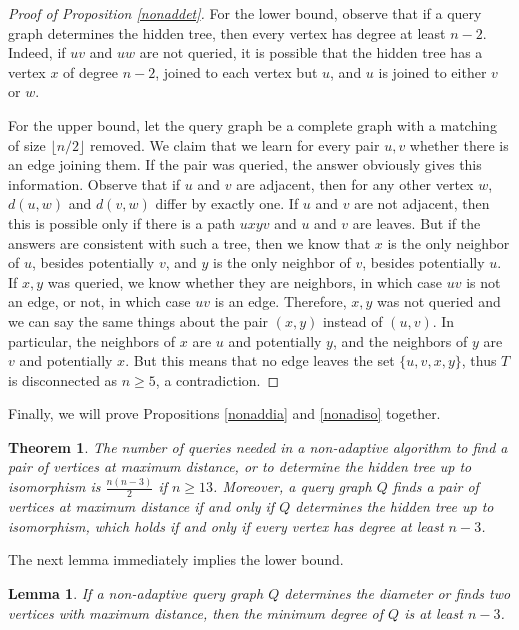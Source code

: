 \documentclass[12pt,a4paper]{amsart}
\theoremstyle{plain}
\newtheorem{thm}{Theorem}[section]
\newtheorem{lemma}[theorem]{Lemma}
\theoremstyle{definition}
\begin{document}
\begin{proof}[Proof of Proposition \ref{nonaddet}]
For the lower bound, observe that if a query graph determines the hidden tree, then every vertex has degree at least $n-2$. Indeed, if $uv$ and $uw$ are not queried, it is possible that the hidden tree has a vertex $x$ of degree $n-2$, joined to each vertex but $u$, and $u$ is joined to either $v$ or $w$. 

For the upper bound, let the query graph be a complete graph with a matching of size $\lfloor n/2\rfloor$ removed. We claim that we learn for every pair $u,v$ whether there is an edge joining them. If the pair was queried, the answer obviously gives this information. 
Observe that if $u$ and $v$ are adjacent, then for any other vertex $w$, $d(u,w)$ and $d(v,w)$ differ by exactly one. 
If $u$ and $v$ are not adjacent, then this is possible only if there is a path $uxyv$ and $u$ and $v$ are leaves. 
But if the answers are consistent with such a tree, then we know that $x$ is the only neighbor of $u$, besides potentially $v$, and $y$ is the only neighbor of $v$, besides potentially $u$. If $x,y$ was queried, we know whether they are neighbors, in which case $uv$ is not an edge, or not, in which case $uv$ is an edge. Therefore, $x,y$ was not queried and we can say the same things about the pair $(x,y)$ instead of $(u,v)$. In particular, the neighbors of $x$ are $u$ and potentially $y$, and the neighbors of $y$ are $v$ and potentially $x$. But this means that no edge leaves the set $\{u,v,x,y\}$, thus $T$ is disconnected as $n\ge 5$, a contradiction.    
\end{proof}

Finally, we will prove Propositions \ref{nonaddia} and \ref{nonadiso} together. 



\begin{thm}\label{nemad}
    The number of queries needed in a non-adaptive algorithm to find a pair of vertices at maximum distance, or to determine the hidden tree up to isomorphism is $\frac{n(n-3)}{2}$ if $n \geq 13$. Moreover, a query graph $Q$ finds a pair of vertices at maximum distance if and only if $Q$ determines the hidden tree up to isomorphism, which holds if and only if every vertex has degree at least $n-3$.
\end{thm}

The next lemma immediately implies the lower bound.

\begin{lemma}\label{lemi}
    If a non-adaptive query graph $Q$ determines the diameter or finds two vertices with maximum distance, then the minimum degree of $Q$ is at least $n-3$.
\end{lemma}
\end{document}
